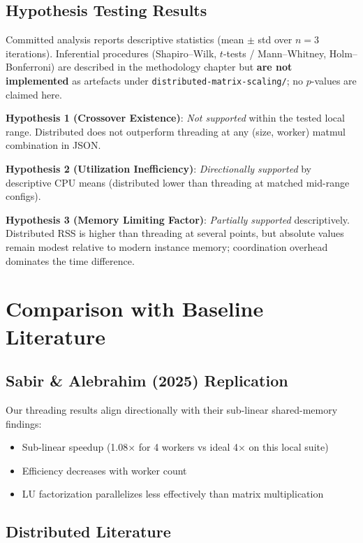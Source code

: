 \subsection{Hypothesis Testing Results}

Committed analysis reports descriptive statistics (mean $\pm$ std over $n{=}3$ iterations). Inferential procedures (Shapiro--Wilk, $t$-tests / Mann--Whitney, Holm--Bonferroni) are described in the methodology chapter but \textbf{are not implemented} as artefacts under \texttt{distributed-matrix-scaling/}; no $p$-values are claimed here.

\textbf{Hypothesis 1 (Crossover Existence)}: \textit{Not supported} within the tested local range. Distributed does not outperform threading at any (size, worker) matmul combination in JSON.

\textbf{Hypothesis 2 (Utilization Inefficiency)}: \textit{Directionally supported} by descriptive CPU means (distributed lower than threading at matched mid-range configs).

\textbf{Hypothesis 3 (Memory Limiting Factor)}: \textit{Partially supported} descriptively. Distributed RSS is higher than threading at several points, but absolute values remain modest relative to modern instance memory; coordination overhead dominates the time difference.

\section{Comparison with Baseline Literature}

\subsection{Sabir \& Alebrahim (2025) Replication}

Our threading results align directionally with their sub-linear shared-memory findings:
\begin{itemize}
    \item Sub-linear speedup (1.08× for 4 workers vs ideal 4× on this local suite)
    \item Efficiency decreases with worker count
    \item LU factorization parallelizes less effectively than matrix multiplication
\end{itemize}

\subsection{Distributed Literature}

